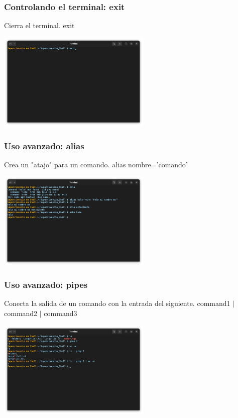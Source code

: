\documentclass[10pt]{beamer}
\begin{document}
	\begin{frame}
		\frametitle{Controlando el terminal: exit}
		\begin{alertblock}{Cierra el terminal.}
			exit
		\end{alertblock}
		\begin{center}\includegraphics[width=0.55\textwidth]{exit}
		\end{center}
	\end{frame}

	\begin{frame}
		\frametitle{Uso avanzado: alias}
		\begin{alertblock}{Crea un "atajo" para un comando.}
			alias nombre='comando'
		\end{alertblock}
		\begin{center}
			\includegraphics[width=0.55\textwidth]{alias}
		\end{center}
	\end{frame}	

	\begin{frame}
		\frametitle{Uso avanzado: pipes}
		\begin{alertblock}{Conecta la salida de un comando con la entrada del siguiente.}
			command1 $|$ command2 $|$ command3 
		\end{alertblock}
		\begin{center}
			\includegraphics[width=0.55\textwidth]{pipes}
		\end{center}
	\end{frame}
	
\end{document}
